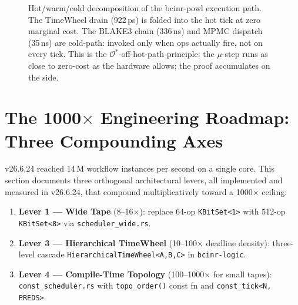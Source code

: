 \documentclass[12pt,a4paper]{article}
\theoremstyle{definition}
\theoremstyle{remark}
\newcommand{\Ostar}{\mathcal{O}^{*}}
\begin{document}
\begin{figure}[h]
\caption{Hot/warm/cold decomposition of the bcinr-powl execution path.
The TimeWheel drain (922\,ps) is folded into the hot tick at zero marginal cost.
The BLAKE3 chain (336\,ns) and MPMC dispatch (35\,ns) are cold-path:
invoked only when ops actually fire, not on every tick.
This is the $\Ostar$-off-hot-path principle: the $\mu$-step runs as close to zero-cost
as the hardware allows; the proof accumulates on the side.}
\label{fig:hotcold}
\end{figure}

\section{The 1000$\times$ Engineering Roadmap: Three Compounding Axes}
\label{sec:1000x}

v26.6.24 reached 14\,M workflow instances per second on a single core.
This section documents three orthogonal architectural levers, all implemented and
measured in v26.6.24, that compound multiplicatively toward a 1000$\times$ ceiling:

\begin{enumerate}
\item \textbf{Lever 1 — Wide Tape} (8–16$\times$): replace 64-op \texttt{KBitSet<1>} with
      512-op \texttt{KBitSet<8>} via \texttt{scheduler\_wide.rs}.
\item \textbf{Lever 3 — Hierarchical TimeWheel} (10–100$\times$ deadline density):
      three-level cascade \texttt{HierarchicalTimeWheel<A,B,C>} in \texttt{bcinr-logic}.
\item \textbf{Lever 4 — Compile-Time Topology} (100–1000$\times$ for small tapes):
      \texttt{const\_scheduler.rs} with \texttt{topo\_order()} const fn and
      \texttt{const\_tick<N, PREDS>}.
\end{enumerate}
\end{document}
